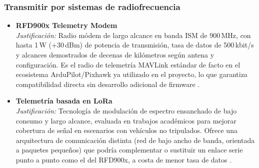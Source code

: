 \subsubsection*{Transmitir por sistemas de radiofrecuencia}
\begin{itemize}
  \item \textbf{RFD900x Telemetry Modem} \\
  \textit{Justificación:} Radio módem de largo alcance en banda ISM de 900\,MHz, con hasta 1\,W 
  (+30\,dBm) de potencia de transmisión, tasa de datos de 500\,kbit/s y alcances demostrados de decenas 
  de kilómetros según antena y configuración. Es el radio de telemetría MAVLink estándar de facto en el 
  ecosistema ArduPilot/Pixhawk ya utilizado en el proyecto, lo que garantiza compatibilidad directa sin 
  desarrollo adicional de firmware \cite{Cite10}. \\

  \item \textbf{Telemetría basada en LoRa} \\
  \textit{Justificación:} Tecnología de modulación de espectro ensanchado de bajo consumo y largo 
  alcance, evaluada en trabajos académicos para mejorar cobertura de señal en escenarios con vehículos 
  no tripulados. Ofrece una arquitectura de comunicación distinta (red de bajo ancho de banda, orientada 
  a paquetes pequeños) que podría complementar o sustituir un enlace serie punto a punto como el del 
  RFD900x, a costa de menor tasa de datos \cite{Cite24}. \\
\end{itemize}

